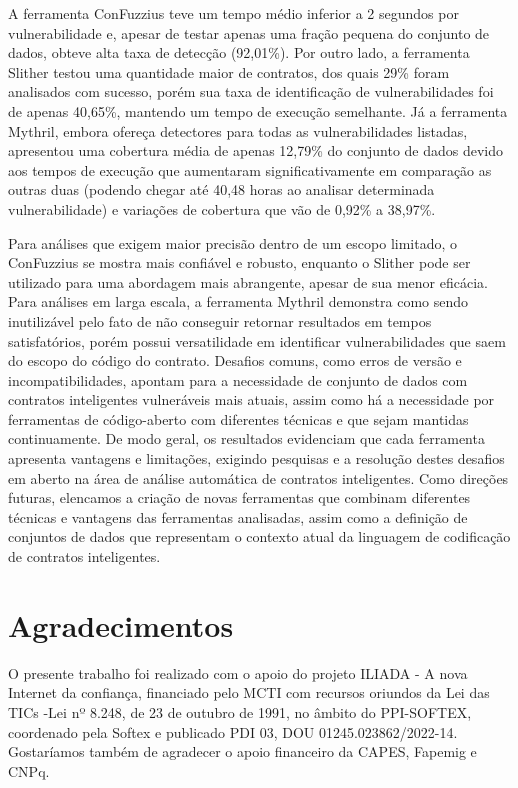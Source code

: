 \documentclass[12pt]{article}
\begin{document}
A ferramenta ConFuzzius teve um tempo médio inferior a 2 segundos por vulnerabilidade e, apesar de testar apenas uma fração pequena do conjunto de dados, obteve alta taxa de detecção (92,01\%). Por outro lado, a ferramenta Slither testou uma quantidade maior de contratos, dos quais 29\% foram analisados com sucesso, porém sua taxa de identificação de vulnerabilidades foi de apenas 40,65\%, mantendo um tempo de execução semelhante. Já a ferramenta Mythril, embora ofereça detectores para todas as vulnerabilidades listadas, apresentou uma cobertura média de apenas 12,79\% do conjunto de dados devido aos tempos de execução que aumentaram significativamente em comparação as outras duas (podendo chegar até 40,48 horas ao analisar determinada vulnerabilidade) e variações de cobertura que vão de 0,92\% a 38,97\%.

Para análises que exigem maior precisão dentro de um escopo limitado, o ConFuzzius se mostra mais confiável e robusto, enquanto o Slither pode ser utilizado para uma abordagem mais abrangente, apesar de sua menor eficácia. Para análises em larga escala, a ferramenta Mythril demonstra como sendo inutilizável pelo fato de não conseguir retornar resultados em tempos satisfatórios, porém possui versatilidade em identificar vulnerabilidades que saem do escopo do código do contrato. Desafios comuns, como erros de versão e incompatibilidades, apontam para a necessidade de conjunto de dados com contratos inteligentes vulneráveis mais atuais, assim como há a necessidade por ferramentas de código-aberto com diferentes técnicas e que sejam mantidas continuamente. De modo geral, os resultados evidenciam que cada ferramenta apresenta vantagens e limitações, exigindo pesquisas e a resolução destes desafios em aberto na área de análise automática de contratos inteligentes. Como direções futuras, elencamos a criação de novas ferramentas que combinam diferentes técnicas e vantagens das ferramentas analisadas, assim como a definição de conjuntos de dados que representam o contexto atual da linguagem de codificação de contratos inteligentes.

\section{Agradecimentos}\label{sec:acknowledgements}
O presente trabalho foi realizado com o apoio do projeto ILIADA - A nova Internet da confiança, financiado pelo MCTI com recursos oriundos da Lei das TICs -Lei nº 8.248, de 23 de outubro de 1991, no âmbito do PPI-SOFTEX, coordenado pela Softex e publicado PDI 03, DOU 01245.023862/2022-14. Gostaríamos também de agradecer o apoio financeiro da CAPES, Fapemig e CNPq.




\end{document}
